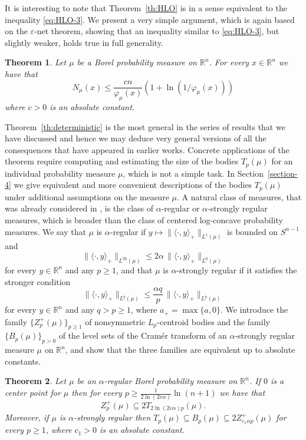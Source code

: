 \documentclass[11pt,leqno]{article}
\newtheorem{theorem}{Theorem}[section]
\theoremstyle{definition}
\theoremstyle{remark}
\numberwithin{equation}{section}
\newcommand{\ls}{\leqslant}
\newcommand{\gr}{\geqslant}
\renewcommand{\epsilon}{\varepsilon}
\newcommand{\1}{\textbf{1}}
\begin{document}
It is interesting to note that Theorem~\ref{th:HLO} is in a sense equivalent to the inequality \eqref{eq:HLO-3}. We present
a very simple argument, which is again based on the $\epsilon$-net theorem, showing that an inequality similar to \eqref{eq:HLO-3},
but slightly weaker, holds true in full generality.

\begin{theorem}\label{th:N-varphi}
Let $\mu$ be a Borel probability measure on $\mathbb{R}^n$. For every $x\in\mathbb{R}^n$ we have that
$$N_{\mu}(x)\ls\frac{cn}{\varphi_{\mu}(x)}\left(1+\ln\left(1/\varphi_{\mu}(x)\right)\right)$$
where $c>0$ is an absolute constant.
\end{theorem}

Theorem~\ref{th:deterministic} is the most general in the series of results that we have discussed and hence we
may deduce very general versions of all the consequences that have appeared in earlier works.
Concrete applications of the theorem require computing and estimating the size of the bodies
$T_p(\mu)$ for an individual probability measure $\mu$, which is not a simple task.
In Section~\ref{section-4} we give equivalent and more convenient descriptions
of the bodies $T_p(\mu)$ under additional assumptions on the measure $\mu$. A natural class of measures, that was already
considered in \cite{GKKMR-2022}, is the class of $\alpha$-regular
or $\alpha$-strongly regular measures, which is broader than the class of centered log-concave probability
measures. We say that $\mu$ is $\alpha $-regular if $y\mapsto \|\langle \cdot,y\rangle_+\|_{L^{1}(\mu)}$ is
bounded on $S^{n-1}$ and
$$\|\langle \cdot,y\rangle_+\|_{L^{2p}(\mu)}\ls 2\alpha \,\|\langle \cdot,y\rangle_+\|_{L^{p}(\mu)}$$
for every $y\in\mathbb{R}^n$ and any $p\gr 1$, and that $\mu$ is $\alpha $-strongly regular if it
satisfies the stronger condition
$$\|\langle \cdot ,y\rangle_+\|_{L^{q}(\mu)}
\ls \frac{\alpha q}{p}\,\|\langle \cdot,y\rangle_+\|_{L^{p}(\mu)}$$
for every $y\in\mathbb{R}^n$ and any $q>p\gr 1$, where $a_+=\max\{a,0\}$. We introduce the family $\{Z_p^+(\mu)\}_{p\gr 1}$
of nonsymmetric $L_p$-centroid bodies and the family $\{B_p(\mu)\}_{p>0}$ of the level sets
of the Cram\'{e}r transform of an $\alpha$-strongly regular measure $\mu$ on $\mathbb{R}^n$, and show that
the three families are equivalent up to absolute constants.

\begin{theorem}\label{th:regular-families}
Let $\mu$ be an $\alpha$-regular Borel probability measure on $\mathbb{R}^n$. If $0$ is a center point for
$\mu$ then for every $p\gr \frac{1}{2\ln (2e\alpha )}\ln (n+1)$ we have that
$$Z_p^+(\mu)\subseteq 2T_{2\ln(2e\alpha )p}(\mu).$$
Moreover, if $\mu$ is $\alpha $-strongly regular then
$T_p(\mu)\subseteq B_p(\mu) \subseteq 2Z_{c_1\alpha p}^+(\mu)$ for every $p\gr 1$, where $c_1>0$ is an
absolute constant.
\end{theorem}
\end{document}
